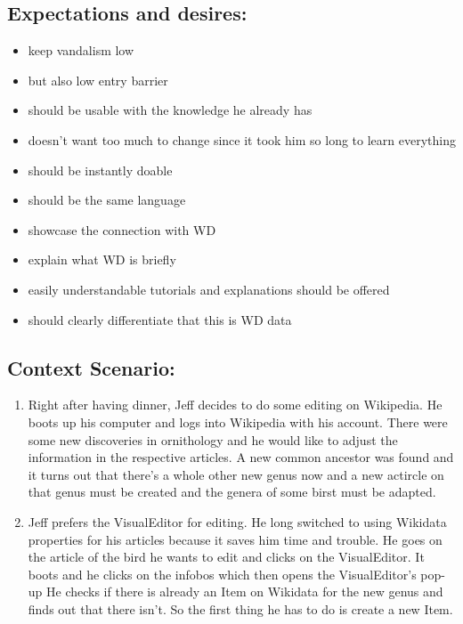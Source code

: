 \documentclass{article}
\begin{document}
\subsection{Expectations and desires:}
\begin{itemize}
\item keep vandalism low
\item but also low entry barrier
\item should be usable with the knowledge he already has
\item doesn't want too much to change since it took him so long to learn everything
\item should be instantly doable
\item should be the same language
\item showcase the connection with WD
\item explain what WD is briefly
\item easily understandable tutorials and explanations should be offered
\item should clearly differentiate that this is WD data
\end{itemize}

\subsection{Context Scenario:}
\begin{enumerate}
\item Right after having dinner, Jeff decides to do some editing on Wikipedia. He boots up his computer and logs into Wikipedia with his account. There were some new discoveries in ornithology and he would like to adjust the information in the respective articles. A new common ancestor was found and it turns out that there's a whole other new genus now and a new actircle on that genus must be created and the genera of some birst must be adapted. 
\item Jeff prefers the VisualEditor for editing. He long switched to using Wikidata properties for his articles because it saves him time and trouble. He goes on the article of the bird he wants to edit and clicks on the VisualEditor. It boots and he clicks on the infobos which then opens the VisualEditor's pop-up He checks if there is already an Item on Wikidata for the new genus and finds out that there isn't. So the first thing he has to do is create a new Item. 
\end{enumerate}
\end{document}
